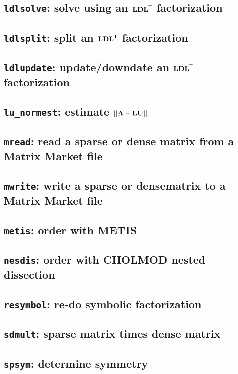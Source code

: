 \documentclass[11pt]{article}
\newcommand{\m}[1]{{\bf{#1}}}       %
\newcommand{\tr}{^{\sf T}}          %
\begin{document}
\subsection{{\tt ldlsolve}: solve using an $\m{LDL}\tr$ factorization}		
\subsection{{\tt ldlsplit}: split an $\m{LDL}\tr$ factorization}		
\newpage
\subsection{{\tt ldlupdate}: update/downdate an $\m{LDL}\tr$ factorization}	
\newpage
\subsection{{\tt lu\_normest}: estimate $||\m{A}-\m{LU}||$}			
\newpage
\subsection{{\tt mread}: read a sparse or dense matrix from a Matrix Market file}
\subsection{{\tt mwrite}: write a sparse or densematrix to a Matrix Market file}	
\newpage
\subsection{{\tt metis}: order with METIS}					
\newpage
\subsection{{\tt nesdis}: order with CHOLMOD nested dissection}			
\newpage
\subsection{{\tt resymbol}: re-do symbolic factorization}			
\subsection{{\tt sdmult}: sparse matrix times dense matrix}			
\newpage
\subsection{{\tt spsym}: determine symmetry}				
\newpage
\end{document}
